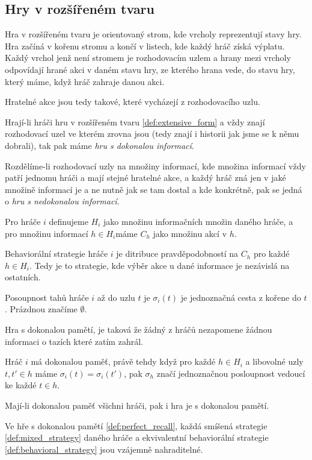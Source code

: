 \subsection{Hry v rozšířeném tvaru}

\begin{definition}\label{def:extensive_form}
Hra v rozšířeném tvaru je orientovaný strom, kde vrcholy reprezentují stavy hry. 
Hra začíná v kořenu stromu a končí v listech, kde každý hráč získá výplatu. 
Každý vrchol jenž není stromem je rozhodovacím uzlem a hrany mezi vrcholy odpovídají hrané akci v daném stavu hry, ze kterého hrana vede, do stavu hry, který máme, když hráč zahraje danou akci. 

Hratelné akce jsou tedy takové, které vycházejí z rozhodovacího uzlu.
\end{definition}

\begin{definition}\label{def:perfect_info}
    Hrají-li hráči hru v rozšířeném tvaru \ref{def:extensive_form} a vždy znají rozhodovací uzel ve kterém zrovna jsou (tedy znají i historii jak jsme se k němu dobrali), tak pak máme \textit{hru s dokonalou informací}. 
\end{definition}
\begin{definition}\label{def:imperfect_info}
    Rozdělíme-li rozhodovací uzly na množiny informací, kde množina informací vždy patří jednomu hráči a mají stejné hratelné akce, a každý hráč zná jen v jaké množině informací je a ne nutně jak se tam dostal a kde konkrétně, pak se jedná o \textit{hru s nedokonalou informací}. 

    Pro hráče $i$ definujeme $H_i$ jako množinu informačních množin daného hráče, a pro množinu informací $h \in H_i$máme $C_h$ jako množinu akcí v $h$.
\end{definition}
\begin{definition}\label{def:behavioral_strategy}
Behaviorální strategie hráče $i$ je ditribuce pravděpodobností na $C_h$ pro každé $h \in H_i$. 
Tedy je to strategie, kde výběr akce u dané informace je nezávislá na ostatních. 
\end{definition}
\begin{definition}\label{def:sequence}
    Posoupnost tahů hráče $i$ až do uzlu $t$ je $\sigma_i(t)$ je jednoznačná cesta z kořene do $t$. 
    Prázdnou značíme $\emptyset$.
\end{definition}
\begin{definition}\label{def:perfect_recall}
Hra s dokonalou pamětí, je taková že žádný z hráčů nezapomene žádnou informaci o tazích které zatím zahrál. 

Hráč $i$ má dokonalou paměť, právě tehdy když pro každé $h \in H_i$ a libovolné uzly $t,t' \in h$ máme $\sigma_i(t) = \sigma_i(t')$, pak $\sigma_h$ značí jednoznačnou posloupnost vedoucí ke každé $t \in h$. 

Mají-li dokonalou paměť všichni hráči, pak i hra je s dokonalou pamětí. 
\end{definition}

\begin{theorem}\label{thm:khun}
    Ve hře s dokonalou pamětí \ref{def:perfect_recall}, každá smíšená strategie \ref{def:mixed_strategy} daného hráče a ekvivalentní behaviorální strategie \ref{def:behavioral_strategy} jsou vzájemně nahraditelné. 
\end{theorem}
